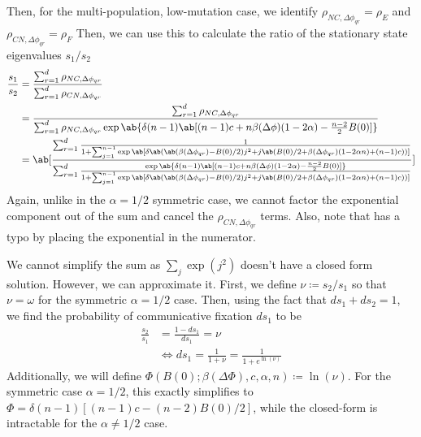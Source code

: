 Then, for the multi-population, low-mutation case, we identify
$\rho_{NC,\Delta \phi_{qr}} = \rho_E$ and $\rho_{CN,\Delta \phi_{qr}} = \rho_F$
Then, we can use this to calculate the ratio of the stationary state
eigenvalues $s_1/s_2$
\begin{align}
  \frac{s_1}{s_2} &= \frac{\sum_{r=1}^{d} \rho_{NC,\Delta \phi_{qr}} }
  {\sum_{r=1}^{d} \rho_{CN,\Delta \phi_{qr}}} \\
                  &= \frac{\sum_{r=1}^{d} \rho_{NC,\Delta \phi_{qr}}
                  }
  {\sum_{r=1}^{d} \rho_{NC,\Delta \phi_{qr}}
                \exp \ab\{
                \delta (n-1)
                \ab[
                (n-1) c + n \beta(\Delta\phi) (1 - 2 \alpha)
                - \frac{n-2}{2} B(0)
                 ]
                 \}
               }
               \\
      &=
      \ab[
\frac
{\sum_{r=1}^{d}
  \frac{1}{1+\sum_{j=1}^{n-1} \exp\ab[\delta \ab(
           \ab(\beta(\Delta\phi_{qr}) - B(0)/2) j^2
           + j \ab(B(0)/2 + \beta(\Delta\phi_{qr}) (1 - 2 \alpha n)  + (n-1) c))]}
                  }
{\sum_{r=1}^{d}
  \frac{\exp \ab\{
                \delta (n-1)
                \ab[
                (n-1) c + n \beta(\Delta\phi) (1 - 2 \alpha)
                - \frac{n-2}{2} B(0)
                 ]
                 \}
}{1+\sum_{j=1}^{n-1} \exp\ab[\delta \ab(
           \ab(\beta(\Delta\phi_{qr}) - B(0)/2) j^2
           + j \ab(B(0)/2 + \beta(\Delta\phi_{qr}) (1 - 2 \alpha n)  +
         (n-1) c))]}
                               }
                               ]
  \label{eq:full_analytic}
\end{align}
Again, unlike in the $\alpha = 1/2$ symmetric case, we cannot factor the
exponential component out of the sum and cancel the $\rho_{CN,\Delta
\phi_{qr}}$ terms.
Also, note that \cite{tripp2022evolutionary} has a typo by placing the
exponential in the numerator.

We cannot simplify the sum as $\sum_j \exp(j^2)$ doesn't have a closed form solution.
However, we can approximate it.
First, we define $\nu \coloneqq s_2/s_1$ so that $\nu = \omega$ for the
symmetric $\alpha = 1/2$ case.
Then, using the fact that $d s_1 + d s_2 = 1$, we find the probability
of communicative fixation $d s_1$ to be
\begin{equation}
  \begin{aligned}
    \frac{s_2}{s_1} &= \frac{1 - d s_1}{d s_1} = \nu \\
                    &\iff d s_1 = \frac{1}{1+\nu} =
                    \frac{1}{1+e^{\ln(\nu)}}
  \end{aligned}
\end{equation}
Additionally, we will define $\Phi(B(0);\beta(\Delta\Phi),c,\alpha,n)
\coloneqq \ln(\nu)$.
For the symmetric case $\alpha=1/2$, this exactly simplifies to $\Phi =
\delta(n-1)[(n-1)c - (n-2)B(0)/2]$, while the closed-form is intractable
for the $\alpha \neq 1/2$ case.

